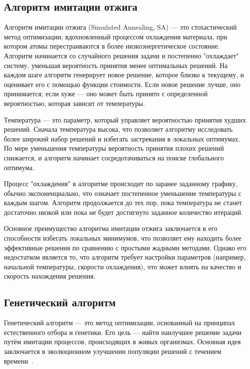 \subsection{Алгоритм имитации отжига}

Алгоритм имитации отжига (Simulated Annealing, SA) — это стохастический метод оптимизации, вдохновленный процессом охлаждения материала, при котором атомы перестраиваются в более низкоэнергетическое состояние. Алгоритм начинается со случайного решения задачи и постепенно "охлаждает" систему, уменьшая вероятность принятия менее оптимальных решений. На каждом шаге алгоритм генерирует новое решение, которое близко к текущему, и оценивает его с помощью функции стоимости. Если новое решение лучше, оно принимается; если хуже — оно может быть принято с определенной вероятностью, которая зависит от температуры\cite{anneal}.

Температура — это параметр, который управляет вероятностью принятия худших решений. Сначала температура высока, что позволяет алгоритму исследовать более широкий набор решений и избегать застревания в локальных оптимумах. По мере уменьшения температуры вероятность принятия плохих решений снижается, и алгоритм начинает сосредотачиваться на поиске глобального оптимума. 

Процесс "охлаждения" в алгоритме происходит по заранее заданному графику, обычно экспоненциально, что означает постепенное уменьшение температуры с каждым шагом. Алгоритм продолжается до тех пор, пока температура не станет достаточно низкой или пока не будет достигнуто заданное количество итераций. 

Основное преимущество алгоритма имитации отжига заключается в его способности избегать локальных минимумов, что позволяет ему находить более эффективные решения по сравнению с простыми жадными методами. Однако его недостатком является то, что алгоритм требует настройки параметров (например, начальной температуры, скорости охлаждения), что может влиять на качество и скорость нахождения решения.

\subsection{Генетический алгоритм}

Генетический алгоритм — это метод оптимизации, основанный на принципах естественного отбора и генетики. Его цель — найти наилучшее решение задачи путём имитации процессов, происходящих в живых организмах. Основная идея заключается в эволюционном улучшении популяции решений с течением времени~\cite{genetic_description}.

